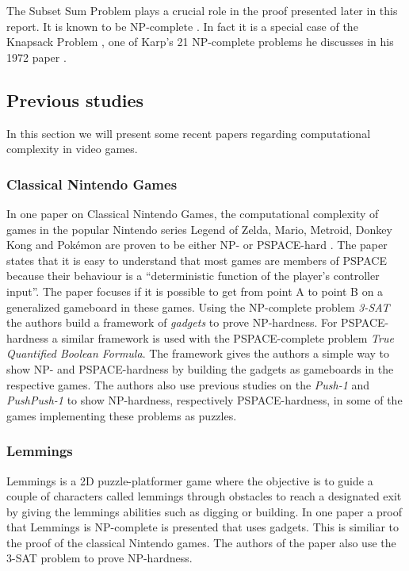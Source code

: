The Subset Sum Problem plays a crucial role in the proof presented later in this report. It is known to be NP-complete \cite[p.~492]{algorithm}. In fact it is a special case of the Knapsack Problem \cite[p.~491]{algorithm}, one of Karp's 21 NP-complete problems he discusses in his 1972 paper \cite{karp}.

\subsection{Previous studies}

In this section we will present some recent papers regarding computational complexity in video games.

\subsubsection{Classical Nintendo Games}

In one paper on Classical Nintendo Games, the computational complexity of games in the popular Nintendo series Legend of Zelda, Mario, Metroid, Donkey Kong and Pokémon are proven to be either NP- or PSPACE-hard \cite{classic}. The paper states that it is easy to understand that most games are members of PSPACE because their behaviour is a ``deterministic function of the player's controller input''. The paper focuses if it is possible to get from point A to point B on a generalized gameboard in these games. Using the NP-complete problem \textit{3-SAT} the authors build a framework of \textit{gadgets} to prove NP-hardness. For PSPACE-hardness a similar framework is used with the PSPACE-complete problem \textit{True Quantified Boolean Formula}. The framework gives the authors a simple way to show NP- and PSPACE-hardness by building the gadgets as gameboards in the respective games. The authors also use previous studies on the \textit{Push-1} \cite{push1} and \textit{PushPush-1} \cite{pushpushk} to show NP-hardness, respectively PSPACE-hardness, in some of the games implementing these problems as puzzles. 

\subsubsection{Lemmings}

Lemmings is a 2D puzzle-platformer game where the objective is to guide a couple of characters called lemmings through obstacles to reach a designated exit by giving the lemmings abilities such as digging or building. In one paper a proof that Lemmings is NP-complete is presented that uses gadgets. This is similiar to the proof of the classical Nintendo games. The authors of the paper also use the 3-SAT problem to prove NP-hardness. \cite{lemmings} 

